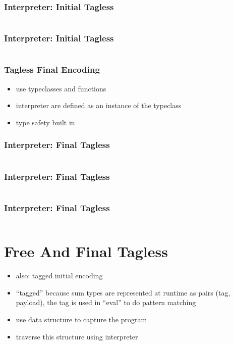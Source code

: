 \documentclass[aspectratio=169, hyperref={colorlinks, linkcolor=beamer@centricgreen}, urlcolor=links]{beamer}
\begin{document}
\begin{frame}
  \frametitle{Interpreter: Initial Tagless}
  \inputminted[fontsize=\footnotesize]{scala}{snippets/initial-tagless-interp.scala}
\end{frame}

\begin{frame}
  \frametitle{Interpreter: Initial Tagless}
  \inputminted[fontsize=\footnotesize]{scala}{snippets/initial-tagless-add.scala}
\end{frame}

\begin{frame}
  \frametitle{Tagless Final Encoding}
  \begin{itemize}
  \item use typeclasses and functions
  \item interpreter are defined as an instance of the typeclass
  \item type safety built in
  \end{itemize}
\end{frame}

\begin{frame}
  \frametitle{Interpreter: Final Tagless}
  \inputminted[fontsize=\footnotesize]{scala}{snippets/initial-tagless-expr.scala}
\end{frame}

\begin{frame}
  \frametitle{Interpreter: Final Tagless}
  \inputminted[fontsize=\footnotesize]{scala}{snippets/initial-tagless-sample.scala}
\end{frame}

\begin{frame}
  \frametitle{Interpreter: Final Tagless}
  \inputminted[fontsize=\footnotesize]{scala}{snippets/initial-tagless-interp.scala}
\end{frame}

\section{Free And Final Tagless}\label{sec:free-and-final-tagless}

\begin{frame}
  \begin{itemize}
  \item also: tagged initial encoding
  \item ``tagged'' because sum types are represented at runtime as
    pairs (tag, payload), the tag is used in ``eval'' to do pattern
    matching
  \item use data structure to capture the program
  \item traverse this structure using interpreter
  \end{itemize}
\end{frame}
\end{document}
